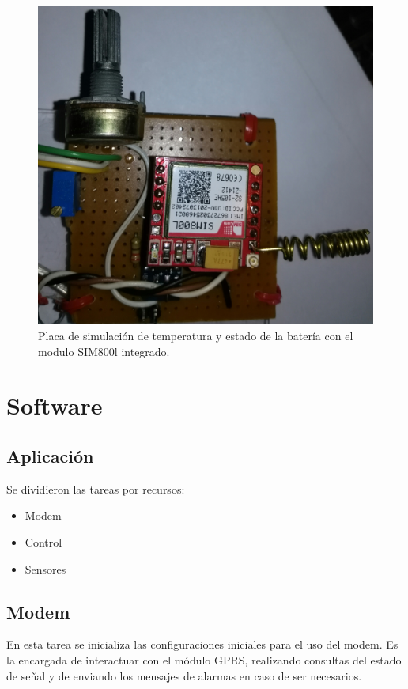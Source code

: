 \begin{figure}[!htb]
  \centering
  \includegraphics[scale=.03]{./Figures/placa_basica.jpg}
  \caption{Placa de simulación de temperatura y estado de la batería con el modulo SIM800l integrado.}
  \label{fig:placa_básicafirst}
\end{figure}


\section{Software}
\subsection{Aplicación}
Se dividieron las tareas por recursos:
\begin{itemize}
  \item Modem 
  \item Control
  \item Sensores
\end{itemize}

\subsection*{Modem}
En esta tarea se inicializa las configuraciones iniciales para el uso del modem. Es la encargada de interactuar con el módulo GPRS, realizando consultas del estado de señal y de enviando los mensajes de alarmas en caso de ser necesarios.

